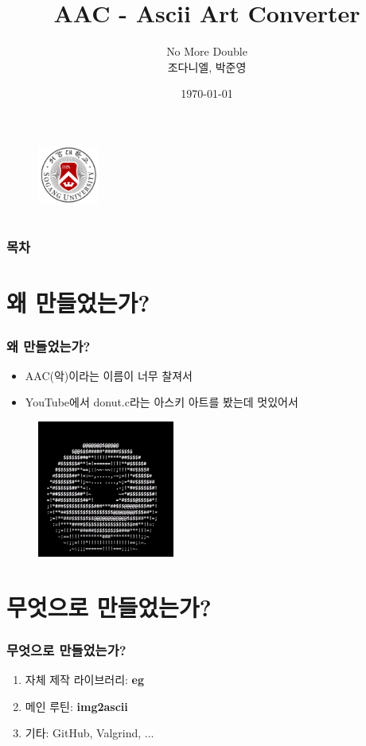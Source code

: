 \documentclass{beamer}
\title{AAC - Ascii Art Converter}
\author{No More Double \\ 조다니엘, 박준영}
\date{\today}
\institute{Sogang University \\ CSE2035/AIE2051}
\newcommand{\eg}{\textbf{eg}}
\newcommand{\imgascii}{\textbf{img2ascii}}
\begin{document}
\section{}
\begin{frame}{}
	\titlepage
	\begin{figure}
		\vspace{-1em}
		\includegraphics[width=2cm]{sogang_university_logo}
		\vspace{1em}
	\end{figure}
\end{frame}

\section{}
\begin{frame}{}
	\frametitle{목차}
	\tableofcontents
\end{frame}

\section{왜 만들었는가?}
\begin{frame}{}
	\frametitle{왜 만들었는가?}
	\begin{itemize}
		\item AAC(악)이라는 이름이 너무 찰져서
		\item YouTube에서 donut.c라는 아스키 아트를 봤는데 멋있어서\cite{donut}
	\end{itemize}
	\begin{figure}
		\centering
		\includegraphics[width=4.5cm, height=4.5cm]{donut.png}
	\end{figure}
\end{frame}

\section{무엇으로 만들었는가?}
\begin{frame}{}
	\frametitle{무엇으로 만들었는가?}
	\begin{enumerate}
		\item 자체 제작 라이브러리: \eg
		\item 메인 루틴: \imgascii
		\item 기타: GitHub, Valgrind, ...
	\end{enumerate}
\end{frame}
\end{document}

